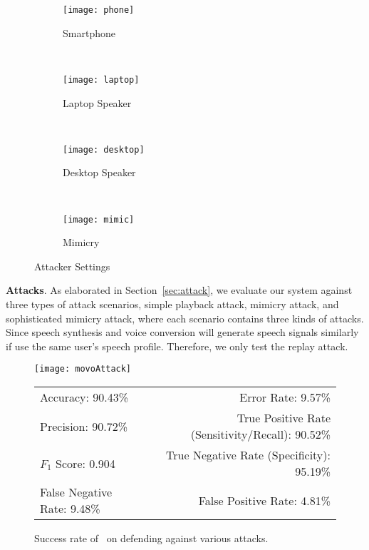 \begin{figure}[!h]
	\centering
	\begin{subfigure}[t]{0.45\textwidth}
		\centering
		\texttt{[image: phone]}
		\caption{Smartphone}
	\end{subfigure}%
	~ 
	\begin{subfigure}[t]{0.45\textwidth}
		\centering
		\texttt{[image: laptop]}
		\caption{Laptop Speaker}
	\end{subfigure}
~ 
\begin{subfigure}[t]{0.45\textwidth}
	\centering
	\texttt{[image: desktop]}
	\caption{Desktop Speaker}
\end{subfigure}
	~
	\begin{subfigure}[t]{0.45\textwidth}
	\centering
	\texttt{[image: mimic]}
	\caption{Mimicry }
\end{subfigure}
	\caption{Attacker Settings}
	\label{fig:attacks}
\end{figure}





\textbf{Attacks}. As elaborated in Section~\ref{sec:attack}, we evaluate our system against three types of attack scenarios, simple playback attack, mimicry attack, and sophisticated mimicry attack, where each scenario contains three kinds of attacks. Since speech synthesis and voice conversion will generate speech signals similarly if use the same user's speech profile. Therefore, we only test the replay attack.

\begin{figure}[H]
	\centering
	\begin{minipage}{.35\linewidth}
		\texttt{[image: movoAttack]}
		\vspace{.05in}
	\end{minipage}
	
	\centering
	\begin{tabular}{lr}
		\toprule
		Accuracy: 90.43\% & \hspace{-.55in} Error Rate: 9.57\% \\
		Precision: 90.72\% & \hspace{-.55in} True Positive Rate (Sensitivity/Recall): 90.52\% \\
		$F_1$ Score: 0.904 & \hspace{-.55in} True Negative Rate (Specificity): 95.19\% \\
		False Negative Rate: 9.48\% & \hspace{-.55in} False Positive Rate: 4.81\% \\
		\bottomrule
	\end{tabular}
	\caption{Success rate of \shortname~on defending against various attacks. }
	\label{fig:defend}
\end{figure}


